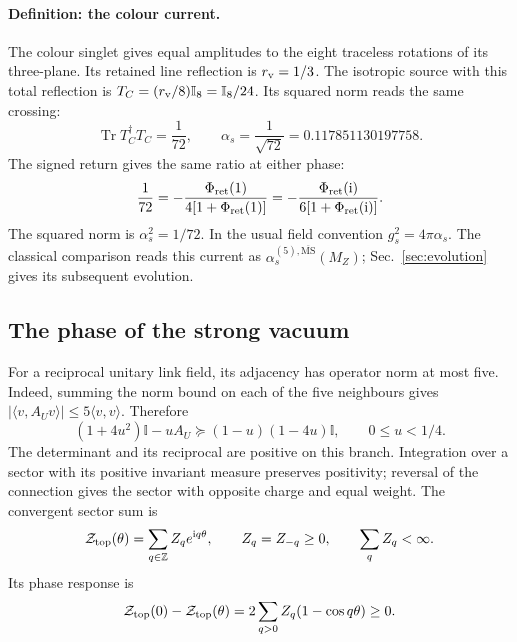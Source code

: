 \documentclass[aps,prx,onecolumn,10pt,notitlepage,nofootinbib,longbibliography]{revtex4-2}
\numberwithin{equation}{section}
\numberwithin{table}{section}
\newcommand{\Id}{\mathbb I}
\newcommand{\Tr}{\operatorname{Tr}}
\newcommand{\ii}{\mathrm i}
\newcommand{\Phis}{\Phi_{\rm ret}}
\begin{document}
\paragraph*{Definition: the colour current.}
The colour singlet gives equal amplitudes to the eight traceless rotations of its three-plane. Its retained line reflection is $r_{\rm v}=1/3$. The isotropic source with this total reflection is $T_C=(r_{\rm v}/8)\Id_8=\Id_8/24$. Its squared norm reads the same crossing:
\begin{equation}
 \Tr T_C^\dagger T_C=\frac1{72},\qquad
 \alpha_s=\frac1{\sqrt{72}}=0.117851130197758.
 \label{eq:alphas}
\end{equation}
The signed return gives the same ratio at either phase:
\begin{equation}
 \frac1{72}=-\frac{\Phis(1)}{4[1+\Phis(1)]}
 =-\frac{\Phis(\ii)}{6[1+\Phis(\ii)]}.
 \label{eq:strong_return_identity}
\end{equation}
The squared norm is $\alpha_s^2=1/72$. In the usual field convention $g_s^2=4\pi\alpha_s$. The classical comparison reads this current as $\alpha_s^{(5),\overline{\mathrm{MS}}}(M_Z)$; Sec.~\ref{sec:evolution} gives its subsequent evolution.

\subsection{The phase of the strong vacuum}

For a reciprocal unitary link field, its adjacency has operator norm at most
five. Indeed, summing the norm bound on each of the five neighbours gives
$|\langle v,A_Uv\rangle|\leq5\langle v,v\rangle$. Therefore
\begin{equation}
 (1+4u^2)\Id-uA_U\succeq(1-u)(1-4u)\Id,
 \qquad 0\leq u<1/4.
 \label{eq:positiveconnection}
\end{equation}
The determinant and its reciprocal are positive on this branch. Integration
over a sector with its positive invariant measure preserves positivity;
reversal of the connection gives the sector with opposite charge and equal
weight. The convergent sector sum is
\begin{equation}
 \mathcal Z_{\rm top}(\theta)=\sum_{q\in\mathbb Z}Z_qe^{\ii q\theta},\qquad
 Z_q=Z_{-q}\geq0,\qquad\sum_qZ_q<\infty.
\end{equation}
Its phase response is
\begin{equation}
 \mathcal Z_{\rm top}(0)-\mathcal Z_{\rm top}(\theta)
 =2\sum_{q>0}Z_q(1-\cos q\theta)\geq0.
 \label{eq:thetasectors}
\end{equation}
\end{document}

